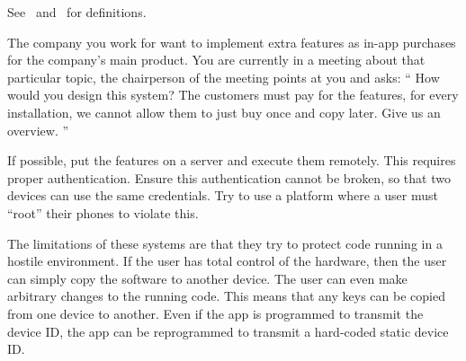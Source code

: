 \documentclass[svv,addpoints]{miunexam}
\begin{document}
\begin{questions}

  \begin{solution}
    See~\cite{Gollmann2011cs} and~\cite{Anderson2008sea} for definitions.
  \end{solution}


  
\question\label{q:trustcomp:C:A}
  The company you work for want to implement extra features as in-app purchases 
  for the company's main product.
  You are currently in a meeting about that particular topic, the chairperson 
  of the meeting points at you and asks:
  \enquote{%
    How would you design this system?
    The customers must pay for the features, for every installation, we cannot 
    allow them to just buy once and copy later.
    Give us an overview.
  }

  \begin{solution}
    If possible, put the features on a server and execute them remotely.
    This requires proper authentication.
    Ensure this authentication cannot be broken, so that two devices can use 
    the same credentials.
    Try to use a platform where a user must \enquote{root} their phones to 
    violate this.

    The limitations of these systems are that they try to protect code running 
    in a hostile environment.
    If the user has total control of the hardware, then the user can simply 
    copy the software to another device.
    The user can even make arbitrary changes to the running code.
    This means that any keys can be copied from one device to another.
    Even if the app is programmed to transmit the device ID, the app can be 
    reprogrammed to transmit a hard-coded static device ID\@.
  \end{solution}


 
\end{questions}


\printbibliography
\end{document}
